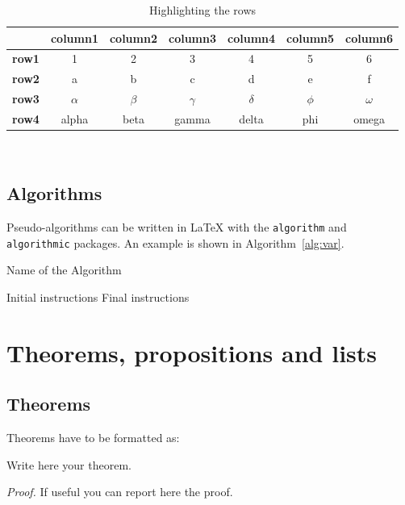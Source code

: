 \documentclass{Configuration_Files/PoliMi3i_thesis}
\begin{document}
\begin{table}[H]
\centering 
    \begin{tabular}{|p{3em} c c c c c c|}
    \hline
     & \textbf{column1} & \textbf{column2} & \textbf{column3} & \textbf{column4} & \textbf{column5} & \textbf{column6} \T\B \\
    \hline \hline
    \textbf{row1} & 1 & 2 & 3 & 4 & 5 & 6 \T\B\\
    \hline
    \textbf{row2} & a & b & c & d & e & f \T\B\\
    \hline
    \textbf{row3} & $\alpha$ & $\beta$ & $\gamma$ & $\delta$ & $\phi$ & $\omega$ \T\B\\
    \hline
    \textbf{row4} & alpha & beta & gamma & delta & phi & omega \B\\
    \hline
    \end{tabular}
    \\[10pt]
    \caption{Highlighting the rows}
    \label{table:exampleR}
\end{table}

\subsection{Algorithms}
\label{subsec:algorithms}

Pseudo-algorithms can be written in \LaTeX{} with the \texttt{algorithm} and \texttt{algorithmic} packages.
An example is shown in Algorithm~\ref{alg:var}.
\begin{algorithm}[H]
    \label{alg:example}
    \caption{Name of the Algorithm}
    \label{alg:var}
    \label{protocol1}
    \begin{algorithmic}[1]
    \STATE Initial instructions
    \ENDIF
    \ENDFOR
    \ENDWHILE
    \STATE Final instructions
    \end{algorithmic}
\end{algorithm} 

\vspace{5mm}

\section{Theorems, propositions and lists}

\subsection{Theorems}
Theorems have to be formatted as:
\begin{theorem}
\label{a_theorem}
Write here your theorem. 
\end{theorem}
\textit{Proof.} If useful you can report here the proof.
\end{document}
